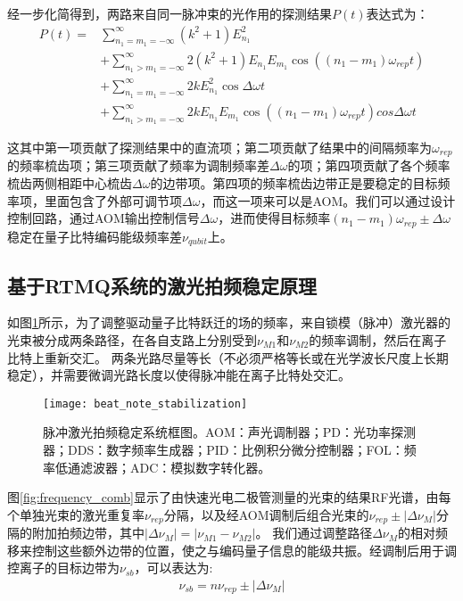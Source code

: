经一步化简得到，两路来自同一脉冲束的光作用的探测结果$P(t)$表达式为：
\begin{align}
    P(t)=&\sum_{n_1=m_1=-\infty}^{\infty}(k^2+1)E_{n_1}^2\\
    &+\sum_{n_1>m_1=-\infty}^{\infty}2(k^2+1)E_{n_1}E_{m_1}\cos\left((n_1-m_1)\omega_{rep}t\right)\\
    &+\sum_{n_1=m_1=-\infty}^{\infty}2kE_{n_1}^2\cos\Delta\omega t\\
    &+\sum_{n_1>m_1=-\infty}^{\infty}2kE_{n_1}E_{m_1}\cos\left((n_1-m_1)\omega_{rep}t\right)cos\Delta\omega t
\end{align}

这其中第一项贡献了探测结果中的直流项；第二项贡献了结果中的间隔频率为$\omega_{rep}$的频率梳齿项；第三项贡献了频率为调制频率差$\Delta\omega$的项；第四项贡献了各个频率梳齿两侧相距中心梳齿$\Delta\omega$的边带项。第四项的频率梳齿边带正是要稳定的目标频率项，里面包含了外部可调节项$\Delta\omega$，而这一项来可以是AOM。我们可以通过设计控制回路，通过AOM输出控制信号$\Delta\omega$，进而使得目标频率$(n_1-m_1)\omega_{rep}\pm \Delta\omega$稳定在量子比特编码能级频率差$\nu_{qubit}$上。

\subsection[基于RTMQ系统的激光拍频稳定原理]{基于RTMQ系统的激光拍频稳定原理}

如图\ref{fig:beat_note_stabilization}所示，为了调整驱动量子比特跃迁的场的频率，来自锁模（脉冲）激光器的光束被分成两条路径，在各自支路上分别受到$\nu_{M1}$和$\nu_{M2}$的频率调制，然后在离子比特上重新交汇。
两条光路尽量等长（不必须严格等长或在光学波长尺度上长期稳定），并需要微调光路长度以使得脉冲能在离子比特处交汇。

\begin{figure}
    \centering
    \caption[脉冲激光拍频稳定系统框图]{脉冲激光拍频稳定系统框图。AOM：声光调制器；PD：光功率探测器；DDS：数字频率生成器；PID：比例积分微分控制器；FOL：频率低通滤波器；ADC：模拟数字转化器。\label{fig:beat_note_stabilization}}
    \texttt{[image: beat\_note\_stabilization]}
\end{figure}

图\ref{fig:frequency_comb}显示了由快速光电二极管测量的光束的结果RF光谱，由每个单独光束的激光重复率$\nu_{rep}$分隔，以及经AOM调制后组合光束的$\nu_{rep}\pm |\Delta \nu_M|$分隔的附加拍频边带，其中$|\Delta \nu_M|=|\nu_{M1}-\nu_{M2}|$。
我们通过调整路径$\Delta\nu_M$的相对频移来控制这些额外边带的位置，使之与编码量子信息的能级共振。经调制后用于调控离子的目标边带为$\nu_{sb}$，可以表达为:
\begin{align}
    \nu_{sb}=n\nu_{rep}\pm|\Delta\nu_M|
\end{align}

